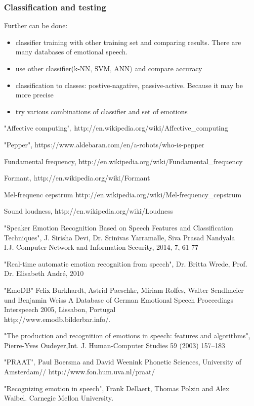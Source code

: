 \documentclass[12pt, letterpaper]{article}
\begin{document}
\subsubsection{Classification and testing}
Further can be done:
\begin{itemize}
	\item classifier training with other training set and comparing results. There are many databases of emotional speech.
	\item use other classifier(k-NN, SVM, ANN) and compare accuracy
	\item classification to classes: postive-nagative, passive-active. Because it may be more precise
	\item try various combinations of classifier and set of emotions
\end{itemize}
\begin{thebibliography}{9}

"Affective computing",
http://en.wikipedia.org/wiki/Affective\_computing

"Pepper",
https://www.aldebaran.com/en/a-robots/who-is-pepper

Fundamental frequency,
http://en.wikipedia.org/wiki/Fundamental\_frequency

Formant,
http://en.wikipedia.org/wiki/Formant

Mel-frequenc cepstrum
http://en.wikipedia.org/wiki/Mel-frequency\_cepstrum

Sound loudness,
http://en.wikipedia.org/wiki/Loudness


"Speaker Emotion Recognition Based on Speech Features and Classification Techniques",
J. Sirisha Devi, Dr. Srinivas Yarramalle, Siva Prasad Nandyala\\
I.J. Computer Network and Information Security, 2014, 7, 61-77

 "Real-time automatic emotion recognition
from speech",
 Dr. Britta Wrede, Prof. Dr. Elisabeth André, 2010

"EmoDB" Felix Burkhardt, Astrid Paeschke, Miriam Rolfes, Walter Sendlmeier und Benjamin Weiss
A Database of German Emotional Speech
Proceedings Interspeech 2005, Lissabon, Portugal\\
http://www.emodb.bilderbar.info/.

"The production and recognition of emotions in
speech: features and algorithms",
 Pierre-Yves Oudeyer,Int. J. Human-Computer Studies 59 (2003) 157–183

 "PRAAT",
 Paul Boersma and David Weenink   
Phonetic Sciences, University of Amsterdam//
http://www.fon.hum.uva.nl/praat/

"Recognizing emotion in speech",
Frank Dellaert, Thomas Polzin and Alex Waibel. Carnegie Mellon University. 


\end{thebibliography}
\end{document}
